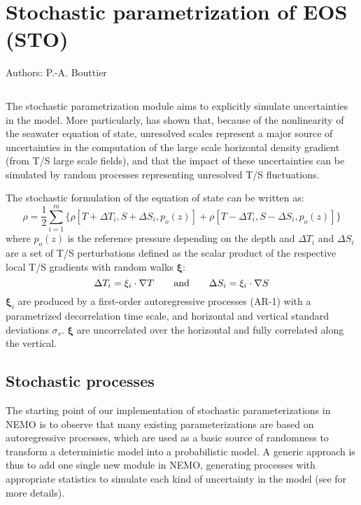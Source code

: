 \documentclass[NEMO_book]{subfiles}
\begin{document}
\chapter{Stochastic parametrization of EOS (STO)}
\label{STO}

Authors: P.-A. Bouttier

\minitoc

\newpage
$\ $\newline    %

The stochastic parametrization module aims to explicitly simulate uncertainties in the model. More particularly, \cite{Brankart_OM2013} has shown that, because of the nonlinearity of the seawater equation of state, unresolved scales represent a major source of uncertainties in the computation of the large scale horizontal density gradient (from T/S large scale fields), and that the impact of these uncertainties can be simulated by random processes representing unresolved T/S fluctuations.

The stochastic formulation of the equation of state can be written as:
\begin{equation}
 \label{eq:eos_sto}
  \rho = \frac{1}{2} \sum_{i=1}^m\{ \rho[T+\Delta T_i,S+\Delta S_i,p_o(z)] + \rho[T-\Delta T_i,S-\Delta S_i,p_o(z)] \}
\end{equation}
where $p_o(z)$ is the reference pressure depending on the depth and $\Delta T_i$ and $\Delta S_i$ are a set of T/S perturbations defined as the scalar product of the respective local T/S gradients with random walks $\mathbf{\xi}$:
\begin{equation}
 \label{eq:sto_pert}
 \Delta T_i = \mathbf{\xi}_i \cdot \nabla T \qquad \hbox{and} \qquad \Delta S_i = \mathbf{\xi}_i \cdot \nabla S
\end{equation}
$\mathbf{\xi}_i$ are produced by a first-order autoregressive processes (AR-1) with a parametrized decorrelation time scale, and horizontal and vertical standard deviations $\sigma_s$. $\mathbf{\xi}$ are uncorrelated over the horizontal and fully correlated along the vertical.


\section{Stochastic processes}
\label{STO_the_details}

The starting point of our implementation of stochastic parameterizations
in NEMO is to observe that many existing parameterizations are based
on autoregressive processes, which are used as a basic source of randomness
to transform a deterministic model into a probabilistic model.
A generic approach is thus to add one single new module in NEMO,
generating processes with appropriate statistics
to simulate each kind of uncertainty in the model
(see \cite{Brankart_al_GMD2015} for more details).
\end{document}
